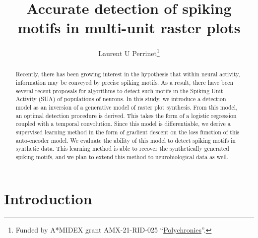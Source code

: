 \documentclass[runningheads]{llncs}
\begin{document}
\title{Accurate detection of spiking motifs in multi-unit raster plots}

\author{Laurent U Perrinet\thanks{Funded by A*MIDEX grant AMX-21-RID-025 ``\href{https://laurentperrinet.github.io/grant/polychronies/}{Polychronies}''.}}
%
%
%
\maketitle              %
%
\begin{abstract} Recently, there has been growing interest in the hypothesis that within neural activity, information may be conveyed by precise spiking motifs. As a result, there have been several recent proposals for algorithms to detect such motifs in the Spiking Unit Activity (SUA) of populations of neurons. In this study, we introduce a detection model as an inversion of a generative model of raster plot synthesis. From this model, an optimal detection procedure is derived. This takes the form of a logistic regression coupled with a temporal convolution. Since this model is differentiable, we derive a supervised learning method in the form of gradient descent on the loss function of this auto-encoder model. We evaluate the ability of this model to detect spiking motifs in synthetic data. This learning method is able to recover the synthetically generated spiking motifs, and we plan to extend this method to neurobiological data as well.
%
\end{abstract}

\section{Introduction}

\end{document}
